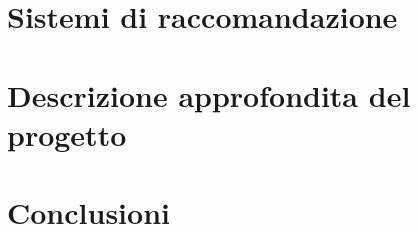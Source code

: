 \documentclass[12pt,fleqn,twoside,a4paper]{book}
\begin{document}
\mainmatter





\chapter{Sistemi di raccomandazione}

\chapter{Descrizione approfondita del progetto}

\chapter{Conclusioni}


\backmatter

\printbibliography[heading=bibintoc, title={Bibliografia}]
\end{document}
